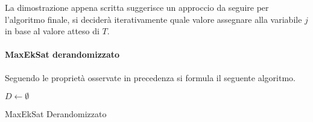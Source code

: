 \begin{remark}
    La dimostrazione appena scritta suggerisce un approccio da seguire per l'algoritmo finale, 
    si deciderà iterativamente quale valore assegnare alla variabile $j$ in base al valore atteso di 
    $T$.
\end{remark}

\paragraph{MaxEkSat derandomizzato}
Seguendo le proprietà osservate in precedenza si formula il seguente algoritmo.

\begin{algorithm}[H]
    \SetAlgoLined
    $D \gets \emptyset$\\
    \caption{MaxEkSat Derandomizzato}
\end{algorithm}


